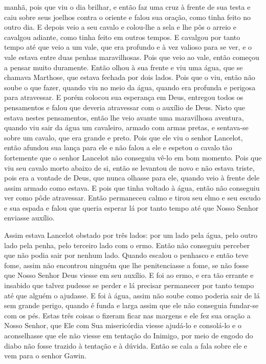 manhã, pois que viu o dia brilhar, e então faz uma cruz à frente de sua testa e
caiu sobre seus joelhos contra o oriente e falou sua oração, como tinha feito
no outro dia. E depois veio a seu cavalo e colou-lhe a sela e lhe pôs o arreio
e cavalgou adiante, como tinha feito em outros tempos. E cavalgou por tanto
tempo até que veio a um vale, que era profundo e à vez valioso para se ver, e o
vale estava entre duas penhas maravilhosas. Pois que veio ao vale, então
começou a pensar muito duramente. Então olhou à sua frente e viu uma água, que
se chamava Marthose, que estava fechada por dois lados. Pois que o viu, então
não soube o que fazer, quando viu no meio da água,  quando era profunda e
perigosa para atravessar. E porém colocou sua esperança em Deus, entregou todos
os pensamentos e falou que deveria atravessar com o auxílio de Deus. Nisto que
estava nestes pensamentos, então lhe veio avante uma maravilhosa aventura,
quando viu sair da água um cavaleiro, armado com armas pretas, e sentava-se
sobre um cavalo, que era grande e preto. Pois que ele viu o senhor Lancelot,
então afundou sua lança para ele e não falou a ele e espetou o cavalo tão
fortemente que o senhor Lancelot não conseguiu vê-lo em bom momento. Pois que
viu seu cavalo morto abaixo de si, então se levantou de novo e não estava
triste, pois era a vontade de Deus, que nunca olhasse para ele, quando veio à
frente dele assim armado como estava. E pois que tinha voltado à água, então
não conseguiu ver como pôde atravessar. Então permaneceu calmo e tirou seu elmo
e seu escudo e sua espada e falou que queria esperar lá por tanto tempo até que
Nosso Senhor enviasse auxílio.

Assim estava Lancelot obstado por três lados: por um lado pela água, pelo outro
lado pela penha, pelo terceiro lado com o ermo. Então não conseguiu perceber
que não podia sair por nenhum lado. Quando escalou o penhasco e então teve
fome, assim não encontrou ninguém que lhe penitenciasse a fome, se não fosse
que Nosso Senhor Deus viesse em seu auxílio. E foi ao ermo, e era tão errante e
insabido que talvez pudesse se perder e lá precisar permanecer por tanto tempo
até que alguém o ajudasse. E foi à água, assim não soube como poderia sair de
lá sem grande perigo, quando é funda e larga assim que ele não conseguia
fundar-se com os pés. Estas três coisas o fizeram ficar nas margens e ele fez
sua oração a Nosso Senhor, que Ele com Sua misericórdia viesse ajudá-lo e
consolá-lo e o aconselhasse que ele não viesse em tentação do Inimigo, por meio
de engodo do diabo não fosse trazido à tentação e à dúvida. Então se cala a
fala sobre ele e vem para o senhor Gawin.

